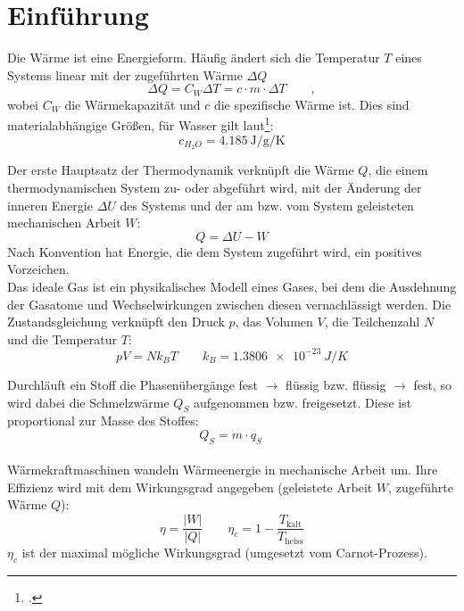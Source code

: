\section{Einführung}
Die Wärme ist eine Energieform. Häufig ändert sich die Temperatur $T$ eines Systems linear mit der zugeführten Wärme $\Delta Q$
\begin{equation}
	\Delta Q =C_W\Delta T =c\cdot m\cdot \Delta T\qquad,
\label{eq:waerme}
\end{equation}
wobei $C_W$ die Wärmekapazität und $c$ die spezifische Wärme ist. Dies sind materialabhängige Größen, für Wasser gilt laut\footcite{anleitung-ss2015}:
\begin{equation}
	c_{H_2 O}=\SI{4.185}{\joule\per\gram\per\kelvin}
\label{eq:cwasser}
\end{equation}

Der erste Hauptsatz der Thermodynamik verknüpft die Wärme $Q$, die einem thermodynamischen System zu- oder abgeführt wird, mit der Änderung der inneren Energie $\Delta U$ des Systems und der am bzw. vom System geleisteten mechanischen Arbeit $W$:
\begin{equation}
	Q=\Delta U - W
\label{eq:1hs}
\end{equation}
Nach Konvention hat Energie, die dem System zugeführt wird, ein positives Vorzeichen.\\

Das ideale Gas ist ein physikalisches Modell eines Gases, bei dem die Ausdehnung der Gasatome und Wechselwirkungen zwischen diesen vernachlässigt werden. Die Zustandsgleichung verknüpft den Druck $p$, das Volumen $V$, die Teilchenzahl $N$ und die Temperatur $T$:
\begin{equation}
	pV=N k_B T\qquad k_B=\SI{1.3806e-23}{J/K}
\label{eq:idgas}
\end{equation}

Durchläuft ein Stoff die Phasenübergänge fest $\rightarrow$ flüssig bzw. flüssig $\rightarrow$ fest, so wird dabei die Schmelzwärme $Q_S$ aufgenommen bzw. freigesetzt. Diese ist proportional zur Masse des Stoffes:
\begin{equation}
	Q_S=m\cdot q_S\
\label{eq:schmelz}
\end{equation}\\

Wärmekraftmaschinen wandeln Wärmeenergie in mechanische Arbeit um. Ihre Effizienz wird mit dem Wirkungsgrad angegeben (geleistete Arbeit $W$, zugeführte Wärme $Q$):
\begin{equation}
	\eta = \frac{|W|}{|Q|} \qquad \eta_c=1-\frac{T_{\text{kalt}}}{T_{\text{heiss}}}
\label{eq:wirkungsgrad}
\end{equation}
$\eta_c$ ist der maximal mögliche Wirkungsgrad (umgesetzt vom Carnot-Prozess).\\

